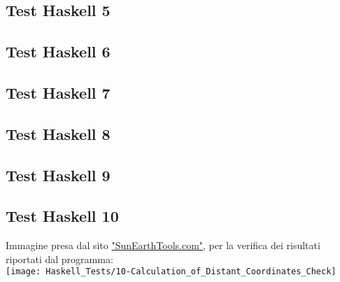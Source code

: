 \documentclass{article}
\begin{document}
\lstset{inputencoding=utf8/latin1}


\subsection*{Test Haskell 5}

\lstset{inputencoding=utf8/latin1}


\subsection*{Test Haskell 6}

\lstset{inputencoding=utf8/latin1}


\subsection*{Test Haskell 7}

\lstset{inputencoding=utf8/latin1}


\subsection*{Test Haskell 8}

\lstset{inputencoding=utf8/latin1}


\subsection*{Test Haskell 9}

\lstset{inputencoding=utf8/latin1}


\subsection*{Test Haskell 10}

\lstset{inputencoding=utf8/latin1}

	
	\bigskip
	Immagine presa dal sito \href{https://www.sunearthtools.com/it/tools/distance.php}{"SunEarthTools.com"}, per la verifica dei risultati riportati dal programma:\\
	\texttt{[image: Haskell\_Tests/10-Calculation\_of\_Distant\_Coordinates\_Check]}
	
\end{document}
